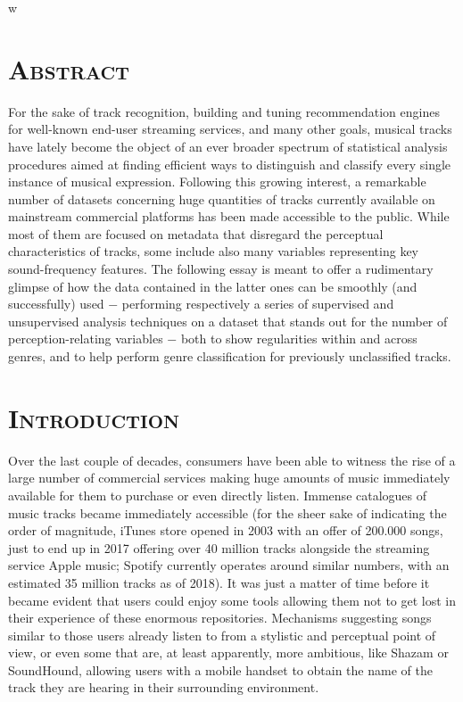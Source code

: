 w\documentclass[11pt, oneside]{article}
\begin{document}
\section*{\textsc{Abstract}}
For the sake of track recognition, building and tuning recommendation engines for well-known end-user streaming services, and many other goals, musical tracks have lately become the object of an ever broader spectrum of statistical analysis procedures aimed at finding efficient ways to distinguish and classify every single instance of musical expression. Following this growing interest, a remarkable number of datasets concerning huge quantities of tracks currently available on mainstream commercial platforms has been made accessible to the public. While most of them are focused on metadata that disregard the perceptual characteristics of tracks, some include also many variables representing key sound-frequency features. The following essay is meant to offer a rudimentary glimpse of how the data contained in the latter ones can be smoothly (and successfully) used $-$ performing respectively a series of supervised and unsupervised analysis techniques on a dataset that stands out for the number of perception-relating variables $-$ both to show regularities within and across genres, and to help perform genre classification for previously unclassified tracks.
\vspace{0.5cm}
\tableofcontents
\newpage
{}
\section[Introduction]{\textsc{Introduction}}
Over the last couple of decades, consumers have been able to witness the rise of a large number of commercial services making huge amounts of music immediately available for them to purchase or even directly listen. Immense catalogues of music tracks became immediately accessible (for the sheer sake of indicating the order of magnitude, iTunes store opened in 2003 with an offer of 200.000 songs, just to end up in 2017 offering over 40 million tracks alongside the streaming service Apple music; Spotify currently operates around similar numbers, with an estimated 35 million tracks as of 2018). It was just a matter of time before it became evident that users could enjoy some tools allowing them not to get lost in their experience of these enormous repositories. Mechanisms suggesting songs similar to those users already listen to from a stylistic and perceptual point of view, or even some that are, at least apparently, more ambitious, like Shazam or SoundHound, allowing users with a mobile handset to obtain the name of the track they are hearing in their surrounding environment.
\end{document}
